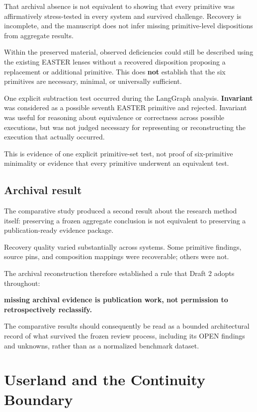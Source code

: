\documentclass[11pt]{article}
\begin{document}
That archival absence is not equivalent to showing that every primitive was affirmatively stress-tested in every system and survived challenge. Recovery is incomplete, and the manuscript does not infer missing primitive-level dispositions from aggregate results.

Within the preserved material, observed deficiencies could still be described using the existing EASTER lenses without a recovered disposition proposing a replacement or additional primitive. This does \textbf{not} establish that the six primitives are necessary, minimal, or universally sufficient.

One explicit subtraction test occurred during the LangGraph analysis. \textbf{Invariant} was considered as a possible seventh EASTER primitive and rejected. Invariant was useful for reasoning about equivalence or correctness across possible executions, but was not judged necessary for representing or reconstructing the execution that actually occurred.

This is evidence of one explicit primitive-set test, not proof of six-primitive minimality or evidence that every primitive underwent an equivalent test.

\subsection{Archival result}

The comparative study produced a second result about the research method itself: preserving a frozen aggregate conclusion is not equivalent to preserving a publication-ready evidence package.

Recovery quality varied substantially across systems. Some primitive findings, source pins, and composition mappings were recoverable; others were not.

The archival reconstruction therefore established a rule that Draft 2 adopts throughout:

\textbf{missing archival evidence is publication work, not permission to retrospectively reclassify.}

The comparative results should consequently be read as a bounded architectural record of what survived the frozen review process, including its OPEN findings and unknowns, rather than as a normalized benchmark dataset.
\section{Userland and the Continuity Boundary}
\end{document}
